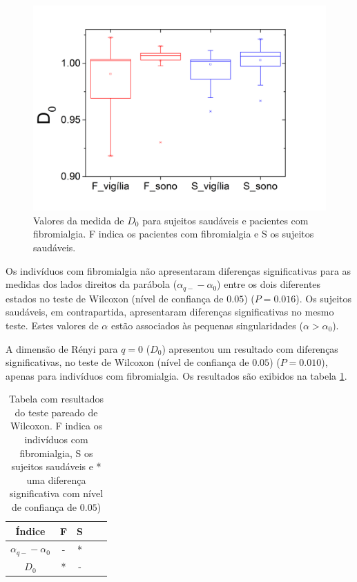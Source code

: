 \documentclass{ufscThesis}
\begin{document}
\begin{figure}[!h]
\centering
\includegraphics[scale=0.3]{dzero_boxplot.png}
\caption{Valores da medida de $D_{0}$ para sujeitos saudáveis e pacientes com fibromialgia. F indica os pacientes com fibromialgia e S os sujeitos saudáveis.}
\label{dzero_boxplot}
\end{figure}

Os indivíduos com fibromialgia não apresentaram diferenças significativas para as medidas dos lados direitos da parábola ($\alpha_{q-} - \alpha_{0}$) entre os dois diferentes estados no teste de Wilcoxon (nível de confiança de $0.05$) ($P=0.016$). Os sujeitos saudáveis, em contrapartida, apresentaram diferenças significativas no mesmo teste. Estes valores de $\alpha$ estão associados às pequenas singularidades ($\alpha > \alpha_{0}$). \par
A dimensão de Rényi para $q=0$ ($D_{0}$) apresentou um resultado com diferenças significativas, no teste de Wilcoxon (nível de confiança de $0.05$) ($P=0.010$), apenas para indivíduos com fibromialgia. Os resultados são exibidos na tabela \ref{resumo_testes}.

\begin{table}
\centering
\begin{tabular}{ccccc}
\hline\hline
Índice & F & S\\
\hline
$\alpha_{q-} - \alpha_{0}$ & - & *\\
$D_{0}$ & * & -\\
\hline\hline
\end{tabular}
\caption{Tabela com resultados do teste pareado de Wilcoxon. F indica os indivíduos com fibromialgia, S os sujeitos saudáveis e * uma diferença significativa com nível de confiança de $0.05$)}
\label{resumo_testes}
\end{table}
\end{document}
